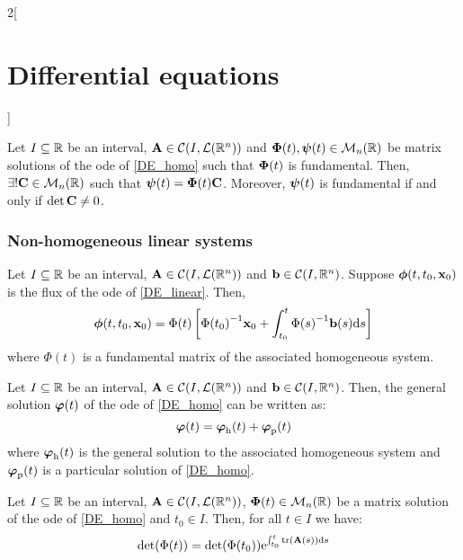 \documentclass[../../../main.tex]{subfiles}
\begin{document}
\begin{multicols}{2}[\section{Differential equations}]
\begin{prop}
\begin{enumerate}
    \end{enumerate}
  \end{prop}
  \begin{prop}
    Let $I\subseteq \mathbb{R}$ be an interval, $\boldsymbol{\mathrm{A}}\in\mathcal{C}(I,\mathcal{L}(\mathbb{R}^n))$ and $\boldsymbol{\mathrm{\Phi}}(t),\boldsymbol{\mathrm{\psi}}(t)\in\mathcal{M}_n(\mathbb{R})$ be matrix solutions of the ode of \cref{DE_homo} such that $\boldsymbol{\mathrm{\Phi}}(t)$ is fundamental. Then, $\exists! \boldsymbol{\mathrm{C}}\in\mathcal{M}_n(\mathbb{R})$ such that $\boldsymbol{\mathrm{\psi}}(t)=\boldsymbol{\mathrm{\Phi}}(t)\boldsymbol{\mathrm{C}}$. Moreover, $\boldsymbol{\mathrm{\psi}}(t)$ is fundamental if and only if $\det \boldsymbol{\mathrm{C}}\ne 0$.
  \end{prop}
  \subsubsection{Non-homogeneous linear systems}
  \begin{prop}
    Let $I\subseteq \mathbb{R}$ be an interval, $\boldsymbol{\mathrm{A}}\in\mathcal{C}(I,\mathcal{L}(\mathbb{R}^n))$ and $\boldsymbol{\mathrm{b}}\in\mathcal{C}(I,\mathbb{R}^n)$. Suppose $\boldsymbol{\mathrm{\phi}}(t,t_0,\boldsymbol{\mathrm{x}}_0)$ is the flux of the ode of \cref{DE_linear}. Then, $$\boldsymbol{\mathrm{\phi}}(t,t_0,\boldsymbol{\mathrm{x}}_0)=\Phi(t)\left[{\Phi(t_0)}^{-1}\boldsymbol{\mathrm{x}}_0+\int_{t_0}^t{\Phi(s)}^{-1}\boldsymbol{\mathrm{b}}(s)\dd s\right]$$ where $\Phi(t)$ is a fundamental matrix of the associated homogeneous system.
  \end{prop}
  \begin{corollary}
    Let $I\subseteq \mathbb{R}$ be an interval, $\boldsymbol{\mathrm{A}}\in\mathcal{C}(I,\mathcal{L}(\mathbb{R}^n))$ and $\boldsymbol{\mathrm{b}}\in\mathcal{C}(I,\mathbb{R}^n)$. Then, the general solution $\boldsymbol{\mathrm{\varphi}}(t)$ of the ode of \cref{DE_homo} can be written as: $$\boldsymbol{\mathrm{\varphi}}(t)=\boldsymbol{\mathrm{\varphi}}_\mathrm{h}(t)+\boldsymbol{\mathrm{\varphi}}_\mathrm{p}(t)$$ where $\boldsymbol{\mathrm{\varphi}}_\mathrm{h}(t)$ is the general solution to the associated homogeneous system and $\boldsymbol{\mathrm{\varphi}}_\mathrm{p}(t)$ is a particular solution of \cref{DE_homo}.
  \end{corollary}
  \begin{prop}
    Let $I\subseteq \mathbb{R}$ be an interval, $\boldsymbol{\mathrm{A}}\in\mathcal{C}(I,\mathcal{L}(\mathbb{R}^n))$, $\boldsymbol{\mathrm{\Phi}}(t)\in\mathcal{M}_n(\mathbb{R})$ be a matrix solution of the ode of \cref{DE_homo} and $t_0\in I$. Then, for all $t\in I$ we have: $$\det(\Phi(t))=\det (\Phi(t_0))\exp{\int_{t_0}^t\trace(\vectorfunction{A}(s))\dd s}$$
  \end{prop}

\end{multicols}
\end{document}
